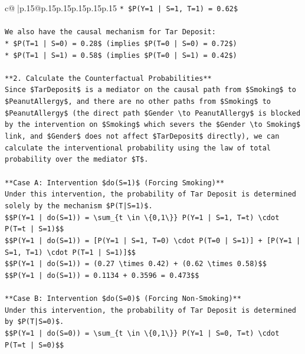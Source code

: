 \documentclass{article}
\begin{document}
{\begin{supertabular}{c@{$\;$}|p{.15\linewidth}@{}p{.15\linewidth}p{.15\linewidth}p{.15\linewidth}p{.15\linewidth}p{.15\linewidth}}
{{{\texttt{*   \$P(Y=1 | S=1, T=1) = 0.62\$} \\
\\ 
\texttt{We also have the causal mechanism for Tar Deposit:} \\
\texttt{*   \$P(T=1 | S=0) = 0.28\$ (implies \$P(T=0 | S=0) = 0.72\$)} \\
\texttt{*   \$P(T=1 | S=1) = 0.58\$ (implies \$P(T=0 | S=1) = 0.42\$)} \\
\\ 
\texttt{**2. Calculate the Counterfactual Probabilities**} \\
\texttt{Since \$TarDeposit\$ is a mediator on the causal path from \$Smoking\$ to \$PeanutAllergy\$, and there are no other paths from \$Smoking\$ to \$PeanutAllergy\$ (the direct path \$Gender \textbackslash{}to PeanutAllergy\$ is blocked by the intervention on \$Smoking\$ which severs the \$Gender \textbackslash{}to Smoking\$ link, and \$Gender\$ does not affect \$TarDeposit\$ directly), we can calculate the interventional probability using the law of total probability over the mediator \$T\$.} \\
\\ 
\texttt{**Case A: Intervention \$do(S=1)\$ (Forcing Smoking)**} \\
\texttt{Under this intervention, the probability of Tar Deposit is determined solely by the mechanism \$P(T|S=1)\$.} \\
\texttt{\$\$P(Y=1 | do(S=1)) = \textbackslash{}sum\_\{t \textbackslash{}in \textbackslash{}\{0,1\textbackslash{}\}\} P(Y=1 | S=1, T=t) \textbackslash{}cdot P(T=t | S=1)\$\$} \\
\texttt{\$\$P(Y=1 | do(S=1)) = {[}P(Y=1 | S=1, T=0) \textbackslash{}cdot P(T=0 | S=1){]} + {[}P(Y=1 | S=1, T=1) \textbackslash{}cdot P(T=1 | S=1){]}\$\$} \\
\texttt{\$\$P(Y=1 | do(S=1)) = (0.27 \textbackslash{}times 0.42) + (0.62 \textbackslash{}times 0.58)\$\$} \\
\texttt{\$\$P(Y=1 | do(S=1)) = 0.1134 + 0.3596 = 0.473\$\$} \\
\\ 
\texttt{**Case B: Intervention \$do(S=0)\$ (Forcing Non{-}Smoking)**} \\
\texttt{Under this intervention, the probability of Tar Deposit is determined by \$P(T|S=0)\$.} \\
\texttt{\$\$P(Y=1 | do(S=0)) = \textbackslash{}sum\_\{t \textbackslash{}in \textbackslash{}\{0,1\textbackslash{}\}\} P(Y=1 | S=0, T=t) \textbackslash{}cdot P(T=t | S=0)\$\$} \\
}}}
\end{supertabular}}
\end{document}
